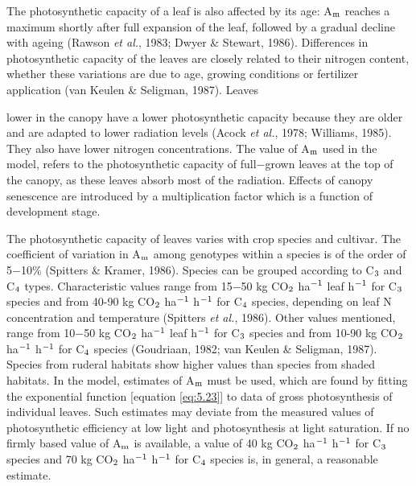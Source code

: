 The photosynthetic capacity of a leaf is also affected by its age: A$_{{\rm m}}$ reaches a maximum
shortly after full expansion of the leaf, followed by a gradual decline with ageing
(Rawson {\it et al.}, 1983; Dwyer \& Stewart, 1986). Differences in photosynthetic capacity of
the leaves are closely related to their nitrogen content, whether these variations are due to
age, growing conditions or fertilizer application (van Keulen \& Seligman, 1987). Leaves

lower in the canopy have a lower photosynthetic capacity because they are older and are
adapted to lower radiation levels (Acock {\it et al.}, 1978; Williams, 1985). They also have
lower nitrogen concentrations. The value of A$_{{\rm m}}$ used in the model, refers to the
photosynthetic capacity of full$-$grown leaves at the top of the canopy, as these leaves
absorb most of the radiation. Effects of canopy senescence are introduced by a multiplication 
factor which is a function of development stage.

The photosynthetic capacity of leaves varies with crop species and cultivar. The coefficient of
variation in A$_{{\rm m}}$ among genotypes within a species is of the order of 5$-$10\%
(Spitters \& Kramer, 1986). Species can be grouped according to C$_{{\rm 3}}$ and C$_{{\rm 4}}$ types.
Characteristic values range from 15$-$50 kg CO$_{{\rm 2}}$ ha$^{{\rm -}{1}}$ leaf h$^{{\rm -}{1}}$ 
for C$_{{\rm 3}}$ species and from 40-90
kg CO$_{{\rm 2}}$ ha$^{{\rm -1}}$ h$^{{\rm -1}}$ for C$_{{\rm 4}}$ species, depending on leaf 
N concentration and temperature (Spitters {\it et al.}, 1986). Other values mentioned, 
range from 10$-$50 kg CO$_{{\rm 2}}$ ha$^{{\rm -}{1}}$ leaf h$^{{\rm -}{1}}$ for
C$_{{\rm 3}}$ species and from 10-90 kg CO$_{{\rm 2}}$ ha$^{{\rm -1}}$ h$^{{\rm -1}}$ 
for C$_{{\rm 4}}$ species (Goudriaan, 1982; van Keulen \&
Seligman, 1987). Species from ruderal habitats show higher values than species from
shaded habitats. In the model, estimates of A$_{{\rm m}}$ must be used, which are found by fitting
the exponential function [equation \ref{eq:5.23}] to data of gross photosynthesis of individual
leaves. Such estimates may deviate from the measured values of photosynthetic efficiency
at low light and photosynthesis at light saturation. If no firmly based value of A$_{{\rm m}}$ is
available, a value of 40 kg CO$_{{\rm 2}}$ ha$^{{\rm -1}}$ h$^{{\rm -}{1}}$ for C$_{{\rm 3}}$ 
species and 70 kg CO$_{{\rm 2}}$ ha$^{{\rm -1}}$ h$^{{\rm -1}}$ for C$_{{\rm 4}}$
species is, in general, a reasonable estimate.

